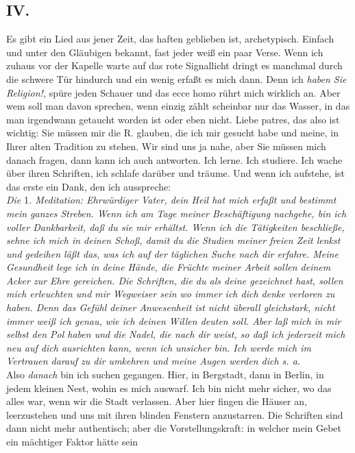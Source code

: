 \documentclass[
]{article}
\author{}
\date{\vspace{-2.5em}}
\begin{document}
\subsection{IV.}\label{iv.}

Es gibt ein Lied aus jener Zeit, das haften geblieben ist, archetypisch.
Einfach und unter den Gläubigen bekannt, fast jeder weiß ein paar Verse.
Wenn ich zuhaus vor der Kapelle warte auf das rote Signallicht dringt es
manchmal durch die schwere Tür hindurch und ein wenig erfaßt es mich
dann. Denn ich \emph{haben Sie Religion!,} spüre jeden Schauer und das
ecce homo rührt mich wirklich an. Aber wem soll man davon sprechen, wenn
einzig zählt scheinbar nur das Wasser, in das man irgendwann getaucht
worden ist oder eben nicht. Liebe patres, das also ist wichtig: Sie
müssen mir die R. glauben, die ich mir gesucht habe und meine, in Ihrer
alten Tradition zu stehen. Wir sind uns ja nahe, aber Sie müssen mich
danach fragen, dann kann ich auch antworten. Ich lerne. Ich studiere.
Ich wache über ihren Schriften, ich schlafe darüber und träume. Und wenn
ich aufstehe, ist das erste ein Dank, den ich ausspreche:\\
\emph{Die }1\emph{. Meditation: Ehrwürdiger Vater, dein Heil hat mich
erfaßt und bestimmt mein ganzes Streben. Wenn ich am Tage meiner
Beschäftigung nachgehe, bin ich voller Dankbarkeit, daß du sie mir
erhältst. Wenn ich die Tätigkeiten beschließe, sehne ich mich in deinen
Schoß, damit du die Studien meiner freien Zeit lenkst und gedeihen läßt
das, was ich auf der täglichen Suche nach dir erfahre. Meine Gesundheit
lege ich in deine Hände, die Früchte meiner Arbeit sollen deinem Acker
zur Ehre gereichen. Die Schriften, die du als deine gezeichnet hast,
sollen mich erleuchten und mir Wegweiser sein wo immer ich dich denke
verloren zu haben. Denn das Gefühl deiner Anwesenheit ist nicht überall
gleichstark, nicht immer weiß ich genau, wie ich deinen Willen deuten
soll. Aber laß mich in mir selbst den Pol haben und die Nadel, die nach
dir weist, so daß ich jederzeit mich neu auf dich ausrichten kann, wenn
ich unsicher bin. Ich werde mich im Vertrauen darauf zu dir umkehren und
meine Augen werden dich s. a.}\\
Also \emph{danach} bin ich suchen gegangen. Hier, in Bergstadt, dann in
Berlin, in jedem kleinen Nest, wohin es mich auswarf. Ich bin nicht mehr
sicher, wo das alles war, wenn wir die Stadt verlassen. Aber hier fingen
die Häuser an, leerzustehen und uns mit ihren blinden Fenstern
anzustarren. Die Schriften sind dann nicht mehr authentisch; aber die
Vorstellungskraft: in welcher mein Gebet ein mächtiger Faktor hätte sein
\end{document}
